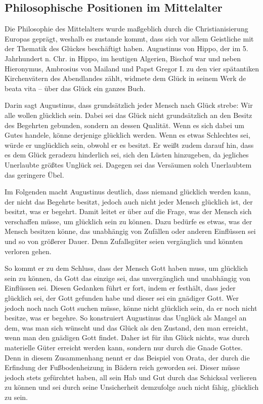 \newpage

\subsection{Philosophische Positionen im Mittelalter}

Die Philosophie des Mittelalters wurde maßgeblich durch die Christianisierung Europas geprägt, weshalb es zustande kommt, dass sich vor allem Geistliche mit der Thematik des Glückes beschäftigt haben. 
Augustinus von Hippo, der im 5. Jahrhundert n. Chr. in Hippo, im heutigen Algerien, Bischof war und neben Hieronymus, Ambrosius von Mailand und Papst Gregor I. zu den vier spätantiken Kirchenvätern des Abendlandes zählt, widmete dem Glück in seinem Werk \glqq de beata vita -- über das Glück\grqq{} ein ganzes Buch.

Darin sagt Augustinus, dass grundsätzlich jeder Mensch nach Glück strebe: \glqq Wir alle wollen glücklich sein.\grqq{}\cite[S.\,21]{A82}
Dabei sei das Glück nicht grundsätzlich an den Besitz des Begehrten gebunden, sondern an dessen Qualität. 
Wenn es sich dabei um Gutes handele, könne derjenige glücklich werden. 
Wenn es etwas Schlechtes sei, würde er unglücklich sein, obwohl er es besitzt. 
Er weißt zudem darauf hin, dass es dem Glück geradezu hinderlich sei, sich den Lüsten hinzugeben, da jegliches Unerlaubte größtes Unglück sei\cite[S.\,21]{A82}.
Dagegen sei das Versäumen solch Unerlaubtem das geringere Übel.

Im Folgenden macht Augustinus deutlich, dass niemand glücklich werden kann, der nicht das Begehrte besitzt, jedoch auch nicht jeder Mensch glücklich ist, der besitzt, was er begehrt. 
Damit leitet er über auf die Frage, was der Mensch sich verschaffen müsse, um glücklich sein zu können\cite[S.\,23]{A82}.
Dazu bedürfe es etwas, was der Mensch besitzen könne, das unabhängig von Zufällen oder anderen Einflüssen sei und so von größerer Dauer. 
Denn Zufallsgüter seien vergänglich und könnten verloren gehen. 

So kommt er zu dem Schluss, dass der Mensch Gott haben muss, um glücklich sein zu können, da Gott das einzige sei, das unvergänglich und unabhängig von Einflüssen sei. 
Diesen Gedanken führt er fort, indem er festhält, dass jeder glücklich sei, der Gott gefunden habe und dieser sei ein gnädiger Gott\cite[S.\,41]{A82}. 
Wer jedoch noch nach Gott suchen müsse, könne nicht glücklich sein, da er noch nicht besitze, was er begehre. 
So konstruiert Augustinus das Unglück als Mangel an dem, was man sich wünscht und das Glück als den Zustand, den man erreicht, wenn man den gnädigen Gott findet. 
Daher ist für ihn Glück nichts, was durch materielle Güter erreicht werden kann, sondern nur durch die Gnade Gottes. 
Denn in diesem Zusammenhang nennt er das Beispiel von Orata, der durch die Erfindung der Fußbodenheizung in Bädern reich geworden sei. 
Dieser müsse jedoch stets gefürchtet haben, all sein Hab und Gut durch das Schicksal verlieren zu können und sei durch seine Unsicherheit demzufolge auch nicht fähig, glücklich zu sein\cite[S.\,48]{A82}.

